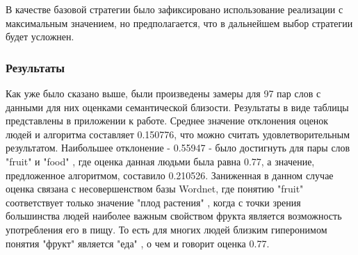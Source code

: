 В качестве базовой стратегии было зафиксировано использование реализации с
максимальным значением,
но предполагается, что в дальнейшем выбор стратегии будет усложнен.

\subsubsection{Результаты}
Как уже было сказано выше, были произведены замеры для 97 пар слов
с данными для них оценками семантической близости. Результаты в виде таблицы
представлены в приложении к работе.
Среднее значение отклонения оценок людей и алгоритма составляет 0.150776,
что можно считать удовлетворительным результатом.
Наибольшее отклонение - 0.55947 - было достигнуть для пары слов
"fruit" и "food" ,
где оценка данная людьми была равна 0.77, а значение, предложенное алгоритмом,
составило 0.210526. Заниженная в данном случае оценка связана с несовершенством
базы Wordnet, где понятию "fruit" соответствует только значение "плод растения" ,
когда с точки зрения большинства людей наиболее важным свойством фрукта
является возможность употребления его в пищу. То есть для многих людей
близким гиперонимом понятия "фрукт" является "еда" , о чем и говорит оценка 0.77.









